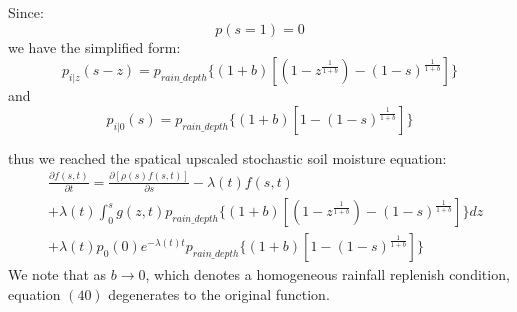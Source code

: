 Since:
\begin{equation}
p(s=1)=0
\end{equation}
we have the simplified form:
\begin{equation}
p_{i|z}(s-z)=p_{rain\_depth} \lbrace(1+b)[(1-z^{\frac{1}{1+b}})-(1-s)^{\frac{1}{1+b}}]\rbrace
\end{equation}
and
\begin{equation}
p_{i|0}(s)=p_{rain\_depth} \lbrace(1+b)[1-(1-s)^{\frac{1}{1+b}}]\rbrace
\end{equation}

thus we reached the spatical upscaled stochastic soil moisture equation:
 \begin{equation}
 \begin{split}
 &\frac{\partial{f(s,t)}}{\partial t}=\frac{\partial{[\rho(s)f(s,t)]}}{\partial s}-\lambda(t)f(s,t)\\&+\lambda(t)\int_{0}^{s} g(z,t)p_{rain\_depth} \lbrace(1+b)[(1-z^{\frac{1}{1+b}})-(1-s)^{\frac{1}{1+b}}]\rbrace dz\\&+\lambda(t)p_0(0)e^{-\lambda(t) t}p_{rain\_depth} \lbrace(1+b)[1-(1-s)^{\frac{1}{1+b}}]\rbrace
 \end{split}
 \end{equation}
We note that as $b\rightarrow0$, which denotes a homogeneous rainfall replenish condition, equation $(40)$ degenerates to the original function.
\fi


